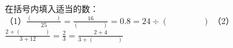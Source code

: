 
在括号内填入适当的数：\\
（1）$\frac{(\hspace{4em})}{25}=\frac{16}{(\hspace{4em})}=0.8=24 \div (\hspace{4em})$
（2）$\frac{2+(\hspace{4em})}{3+12}=\frac{2}{3}=\frac{2+4}{3+(\hspace{4em})}$
